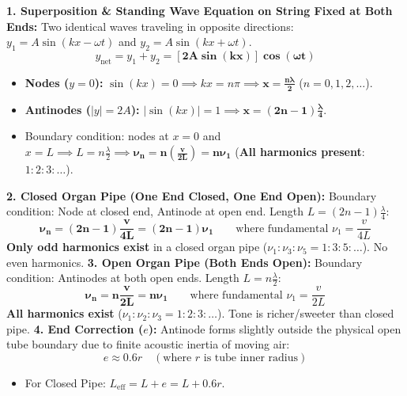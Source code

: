 \documentclass[10pt,twoside,openright]{book}
\begin{document}
\begin{formulabox}
\textbf{1. Superposition \& Standing Wave Equation on String Fixed at Both Ends:}
Two identical waves traveling in opposite directions: $y_1 = A\sin(kx - \omega t)$ and $y_2 = A\sin(kx + \omega t)$.
\begin{equation}
  y_{\text{net}} = y_1 + y_2 = \mathbf{[2A \sin(kx)] \cos(\omega t)}
\end{equation}
\begin{itemize}
  \item \textbf{Nodes ($y=0$):} $\sin(kx) = 0 \implies kx = n\pi \implies \mathbf{x = \frac{n\lambda}{2}}$ ($n = 0, 1, 2, \dots$).
  \item \textbf{Antinodes ($|y|=2A$):} $|\sin(kx)| = 1 \implies \mathbf{x = (2n-1)\frac{\lambda}{4}}$.
  \item Boundary condition: nodes at $x = 0$ and $x = L \implies L = n\frac{\lambda}{2} \implies \mathbf{\nu_n = n \left(\frac{v}{2L}\right) = n \nu_1}$ (\textbf{All harmonics present}: $1 : 2 : 3 : \dots$).
\end{itemize}
\textbf{2. Closed Organ Pipe (One End Closed, One End Open):}
Boundary condition: Node at closed end, Antinode at open end. Length $L = (2n-1)\frac{\lambda}{4}$:
\begin{equation}
  \mathbf{\nu_n = (2n-1)\frac{v}{4L} = (2n-1)\nu_1} \qquad \text{where fundamental } \nu_1 = \frac{v}{4L}
\end{equation}
\textbf{Only odd harmonics exist} in a closed organ pipe ($\nu_1 : \nu_3 : \nu_5 = 1 : 3 : 5 : \dots$). No even harmonics.
\textbf{3. Open Organ Pipe (Both Ends Open):}
Boundary condition: Antinodes at both open ends. Length $L = n\frac{\lambda}{2}$:
\begin{equation}
  \mathbf{\nu_n = n \frac{v}{2L} = n \nu_1} \qquad \text{where fundamental } \nu_1 = \frac{v}{2L}
\end{equation}
\textbf{All harmonics exist} ($\nu_1 : \nu_2 : \nu_3 = 1 : 2 : 3 : \dots$). Tone is richer/sweeter than closed pipe.
\textbf{4. End Correction ($e$):}
Antinode forms slightly outside the physical open tube boundary due to finite acoustic inertia of moving air:
\begin{equation}
  e \approx 0.6 r \quad (\text{where } r \text{ is tube inner radius})
\end{equation}
\begin{itemize}
  \item For Closed Pipe: $L_{\text{eff}} = L + e = L + 0.6r$.

\end{itemize}
\end{formulabox}
\end{document}

